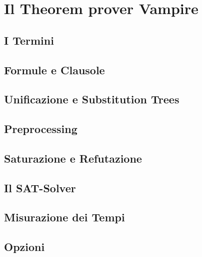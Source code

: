 \documentclass[./main.tex]{subfiles}
\begin{document}
\chapter{Il Theorem prover Vampire} \label{chap:vampire}

\section{I Termini}
\section{Formule e Clausole}
\section{Unificazione e Substitution Trees} 
\section{Preprocessing}
\section{Saturazione e Refutazione}
\section{Il SAT-Solver}
\section{Misurazione dei Tempi}
\section{Opzioni}
\end{document}
